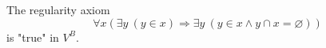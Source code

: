 The regularity axiom
$$\forall x \left( \exists y \ (y \in x) \Rightarrow \exists y \ (y \in x \wedge y \cap x = \varnothing) \right)$$
is "true" in $V^B$.